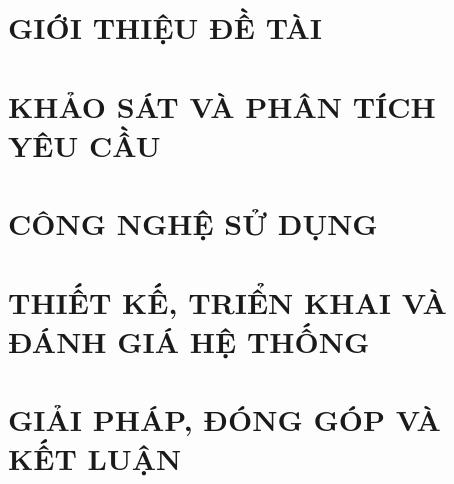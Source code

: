 \documentclass[a4paper,13pt,3p,twoside]{report}
\theoremstyle{definition}
\begin{document}
\glsaddall
\renewcommand*{\glossaryname}{Danh sách thuật ngữ}
\renewcommand*{\acronymname}{DANH MỤC THUẬT NGỮ VÀ TỪ VIẾT TẮT}
\renewcommand*{\entryname}{Thuật ngữ}
\renewcommand*{\descriptionname}{Ý nghĩa}

\printnoidxglossaries


% 


\newpage
{}

\pagestyle{fancy}
\fancyhf{}
\fancyhead[RE, LO]{\leftmark}
\fancyfoot[RE, LO]{\thepage}

\chapter{GIỚI THIỆU ĐỀ TÀI}
\label{chapter:Introduction}

\newpage
\chapter{KHẢO SÁT VÀ PHÂN TÍCH YÊU CẦU}
\label{chapter:Related_works}



\newpage
\chapter{CÔNG NGHỆ SỬ DỤNG}
\label{chapter:Methodology}


\newpage
\chapter{THIẾT KẾ, TRIỂN KHAI VÀ ĐÁNH GIÁ HỆ THỐNG}
\label{chapter:Experiment}


\newpage
\chapter{GIẢI PHÁP, ĐÓNG GÓP VÀ KẾT LUẬN}
\label{chapter:SolutionContributionConclusion}
\end{document}

